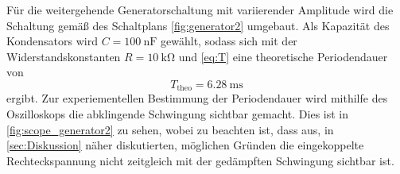 Für die weitergehende Generatorschaltung mit variierender Amplitude wird die Schaltung gemäß des Schaltplans
\autoref{fig:generator2} umgebaut. Als Kapazität des Kondensators wird $C=\qty{100}{\nano\farad}$ gewählt, sodass sich mit der
Widerstandskonstanten $R=\qty{10}{\kilo\ohm}$ und \autoref{eq:T} eine theoretische Periodendauer von
\begin{equation*}
  T_{\mathrm{theo}} = \qty{6,28}{\milli\second}
\end{equation*}
ergibt. Zur experiementellen Bestimmung der Periodendauer wird mithilfe des Oszilloskops die abklingende Schwingung sichtbar gemacht.
Dies ist in \autoref{fig:scope_generator2} zu sehen, wobei zu beachten ist, dass aus, in \autoref{sec:Diskussion} näher diskutierten, möglichen 
Gründen die eingekoppelte Rechteckspannung nicht zeitgleich mit der gedämpften Schwingung sichtbar ist.
